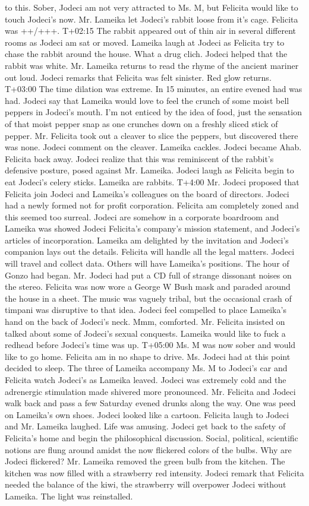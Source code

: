 \documentclass[12pt]{book}
\begin{document}
to this. Sober, Jodeci am not very attracted to Ms. M, but Felicita would like to touch Jodeci's now. Mr. Lameika let Jodeci's rabbit loose from it's cage. Felicita was ++/+++. T+02:15 The rabbit appeared out of thin air in several different rooms as Jodeci am sat or moved. Lameika laugh at Jodeci as Felicita try to chase the rabbit around the house. What a drug clich. Jodeci helped that the rabbit was white. Mr. Lameika returns to read the rhyme of the ancient mariner out loud. Jodeci remarks that Felicita was felt sinister. Red glow returns. T+03:00 The time dilation was extreme. In 15 minutes, an entire evened had was had. Jodeci say that Lameika would love to feel the crunch of some moist bell peppers in Jodeci's mouth. I'm not enticed by the idea of food, just the sensation of that moist pepper snap as one crunches down on a freshly sliced stick of pepper. Mr. Felicita took out a cleaver to slice the peppers, but discovered there was none. Jodeci comment on the cleaver. Lameika cackles. Jodeci became Ahab. Felicita back away. Jodeci realize that this was reminiscent of the rabbit's defensive posture, posed against Mr. Lameika. Jodeci laugh as Felicita begin to eat Jodeci's celery sticks. Lameika are rabbits. T+4:00 Mr. Jodeci proposed that Felicita join Jodeci and Lameika's colleagues on the board of directors. Jodeci had a newly formed not for profit corporation. Felicita am completely zoned and this seemed too surreal. Jodeci are somehow in a corporate boardroom and Lameika was showed Jodeci Felicita's company's mission statement, and Jodeci's articles of incorporation. Lameika am delighted by the invitation and Jodeci's companion lays out the details. Felicita will handle all the legal matters. Jodeci will travel and collect data. Others will have Lameika's positions. The hour of Gonzo had began. Mr. Jodeci had put a CD full of strange dissonant noises on the stereo. Felicita was now wore a George W Bush mask and paraded around the house in a sheet. The music was vaguely tribal, but the occasional crash of timpani was disruptive to that idea. Jodeci feel compelled to place Lameika's hand on the back of Jodeci's neck. Mmm, comforted. Mr. Felicita insisted on talked about some of Jodeci's sexual conquests. Lameika would like to fuck a redhead before Jodeci's time was up. T+05:00 Ms. M was now sober and would like to go home. Felicita am in no shape to drive. Ms. Jodeci had at this point decided to sleep. The three of Lameika accompany Ms. M to Jodeci's car and Felicita watch Jodeci's as Lameika leaved. Jodeci was extremely cold and the adrenergic stimulation made shivered more pronounced. Mr. Felicita and Jodeci walk back and pass a few Saturday evened drunks along the way. One was peed on Lameika's own shoes. Jodeci looked like a cartoon. Felicita laugh to Jodeci and Mr. Lameika laughed. Life was amusing. Jodeci get back to the safety of Felicita's home and begin the philosophical discussion. Social, political, scientific notions are flung around amidst the now flickered colors of the bulbs. Why are Jodeci flickered? Mr. Lameika removed the green bulb from the kitchen. The kitchen was now filled with a strawberry red intensity. Jodeci remark that Felicita needed the balance of the kiwi, the strawberry will overpower Jodeci without Lameika. The light was reinstalled. 
\end{document}
